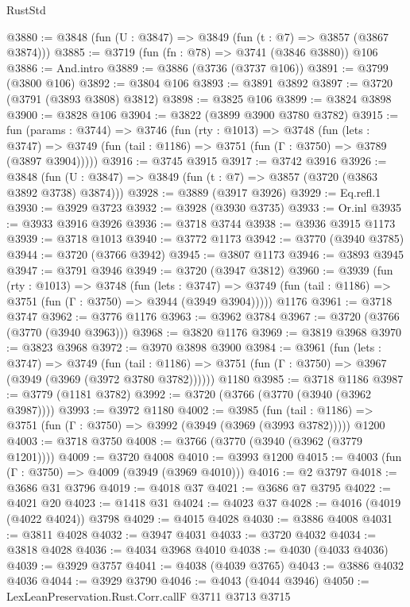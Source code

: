 \begin{lexlean}{RustStd}
\begin{coremodule}
@3880 := @3848 (fun (U : @3847) => @3849 (fun (t : @7) => @3857 (@3867 @3874)))
@3885 := @3719 (fun (fn : @78) => @3741 (@3846 @3880)) @106
@3886 := And.intro
@3889 := @3886 (@3736 (@3737 @106))
@3891 := @3799 (@3800 @106)
@3892 := @3804 @106
@3893 := @3891 @3892
@3897 := @3720 (@3791 (@3893 @3808) @3812)
@3898 := @3825 @106
@3899 := @3824 @3898
@3900 := @3828 @106
@3904 := @3822 (@3899 @3900 @3780 @3782)
@3915 := fun (params : @3744) =>
  @3746
    (fun (rty : @1013) =>
    @3748
      (fun (lets : @3747) =>
      @3749 (fun (tail : @1186) => @3751 (fun (Γ : @3750) => @3789 (@3897 @3904)))))
@3916 := @3745 @3915
@3917 := @3742 @3916
@3926 := @3848 (fun (U : @3847) => @3849 (fun (t : @7) => @3857 (@3720 (@3863 @3892 @3738) @3874)))
@3928 := @3889 (@3917 @3926)
@3929 := Eq.refl.{1}
@3930 := @3929 @3723
@3932 := @3928 (@3930 @3735)
@3933 := Or.inl
@3935 := @3933 @3916 @3926
@3936 := @3718 @3744
@3938 := @3936 @3915 @1173
@3939 := @3718 @1013
@3940 := @3772 @1173
@3942 := @3770 (@3940 @3785)
@3944 := @3720 (@3766 @3942)
@3945 := @3807 @1173
@3946 := @3893 @3945
@3947 := @3791 @3946
@3949 := @3720 (@3947 @3812)
@3960 := @3939
    (fun (rty : @1013) =>
    @3748
      (fun (lets : @3747) =>
      @3749 (fun (tail : @1186) => @3751 (fun (Γ : @3750) => @3944 (@3949 @3904)))))
    @1176
@3961 := @3718 @3747
@3962 := @3776 @1176
@3963 := @3962 @3784
@3967 := @3720 (@3766 (@3770 (@3940 @3963)))
@3968 := @3820 @1176
@3969 := @3819 @3968
@3970 := @3823 @3968
@3972 := @3970 @3898 @3900
@3984 := @3961
    (fun (lets : @3747) =>
    @3749
      (fun (tail : @1186) => @3751 (fun (Γ : @3750) => @3967 (@3949 (@3969 (@3972 @3780 @3782))))))
    @1180
@3985 := @3718 @1186
@3987 := @3779 (@1181 @3782)
@3992 := @3720 (@3766 (@3770 (@3940 (@3962 @3987))))
@3993 := @3972 @1180
@4002 := @3985
    (fun (tail : @1186) => @3751 (fun (Γ : @3750) => @3992 (@3949 (@3969 (@3993 @3782)))))
    @1200
@4003 := @3718 @3750
@4008 := @3766 (@3770 (@3940 (@3962 (@3779 @1201))))
@4009 := @3720 @4008
@4010 := @3993 @1200
@4015 := @4003 (fun (Γ : @3750) => @4009 (@3949 (@3969 @4010)))
@4016 := @2 @3797
@4018 := @3686 @31 @3796
@4019 := @4018 @37
@4021 := @3686 @7 @3795
@4022 := @4021 @20
@4023 := @1418 @31
@4024 := @4023 @37
@4028 := @4016 (@4019 (@4022 @4024)) @3798
@4029 := @4015 @4028
@4030 := @3886 @4008
@4031 := @3811 @4028
@4032 := @3947 @4031
@4033 := @3720 @4032
@4034 := @3818 @4028
@4036 := @4034 @3968 @4010
@4038 := @4030 (@4033 @4036)
@4039 := @3929 @3757
@4041 := @4038 (@4039 @3765)
@4043 := @3886 @4032 @4036
@4044 := @3929 @3790
@4046 := @4043 (@4044 @3946)
@4050 := LexLeanPreservation.Rust.Corr.callF @3711 @3713 @3715

\end{coremodule}
\end{lexlean}
